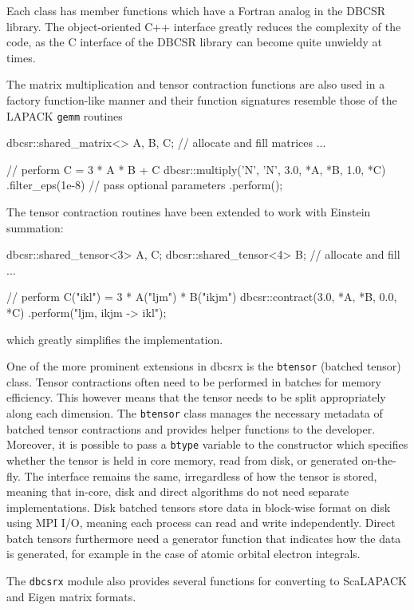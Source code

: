 Each class has member functions which have a Fortran analog in the DBCSR library. The object-oriented C++ interface greatly reduces the complexity of the code, as the C interface of the DBCSR library can become quite unwieldy at times.

The matrix multiplication and tensor contraction functions are also used in a factory function-like manner and their function signatures resemble those of the LAPACK \texttt{gemm} routines
\begin{cppinline}
dbcsr::shared_matrix<> A, B, C;
// allocate and fill matrices ...

// perform C = 3 * A * B + C 
dbcsr::multiply('N', 'N', 3.0, *A, *B, 1.0, *C)
	.filter_eps(1e-8) // pass optional parameters 
	.perform();
\end{cppinline}
\noindent The tensor contraction routines have been extended to work with Einstein summation:
\begin{cppinline}
dbcsr::shared_tensor<3> A, C;
dbcsr::shared_tensor<4> B;
// allocate and fill ...

// perform C("ikl") = 3 * A("ljm") * B("ikjm")
dbcsr::contract(3.0, *A, *B, 0.0, *C)
	.perform("ljm, ikjm -> ikl");
\end{cppinline}
\noindent which greatly simplifies the implementation.

One of the more prominent extensions in dbcsrx is the \texttt{btensor} (batched tensor) class. Tensor contractions often need to be performed in batches for memory efficiency. This however means that the tensor needs to be split appropriately along each dimension. The \texttt{btensor} class manages the necessary metadata of batched tensor contractions and provides helper functions to the developer. Moreover, it is possible to pass a \texttt{btype} variable to the constructor which specifies whether the tensor is held in core memory, read from disk, or generated on-the-fly. The interface remains the same, irregardless of how the tensor is stored, meaning that in-core, disk and direct algorithms do not need separate implementations. Disk batched tensors store data in block-wise format on disk using MPI I/O, meaning each process can read and write independently. Direct batch tensors furthermore need a generator function that indicates how the data is generated, for example in the case of atomic orbital electron integrals. 

The \texttt{dbcsrx} module also provides several functions for converting to ScaLAPACK and Eigen matrix formats. 


